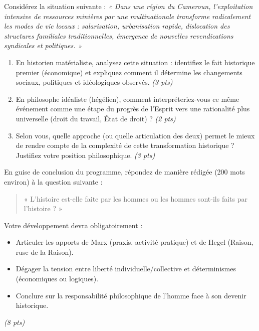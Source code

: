 \documentclass[11pt]{article}
\begin{document}
\begin{exercice}
Considérez la situation suivante : \textit{« Dans une région du Cameroun, l'exploitation intensive de ressources minières par une multinationale transforme radicalement les modes de vie locaux : salarisation, urbanisation rapide, dislocation des structures familiales traditionnelles, émergence de nouvelles revendications syndicales et politiques. »}

\begin{enumerate}
    \item En historien matérialiste, analysez cette situation : identifiez le fait historique premier (économique) et expliquez comment il détermine les changements sociaux, politiques et idéologiques observés. \textit{(3 pts)}
    \item En philosophe idéaliste (hégélien), comment interpréteriez-vous ce même événement comme une étape du progrès de l'Esprit vers une rationalité plus universelle (droit du travail, État de droit) ? \textit{(2 pts)}
    \item Selon vous, quelle approche (ou quelle articulation des deux) permet le mieux de rendre compte de la complexité de cette transformation historique ? Justifiez votre position philosophique. \textit{(3 pts)}
\end{enumerate}
\end{exercice}

\begin{exercice}
En guise de conclusion du programme, répondez de manière rédigée (200 mots environ) à la question suivante :

\begin{quote}
« L'histoire est-elle faite par les hommes ou les hommes sont-ils faits par l'histoire ? »
\end{quote}

Votre développement devra obligatoirement :
\begin{itemize}
    \item Articuler les apports de Marx (praxis, activité pratique) et de Hegel (Raison, ruse de la Raison).
    \item Dégager la tension entre liberté individuelle/collective et déterminismes (économiques ou logiques).
    \item Conclure sur la responsabilité philosophique de l'homme face à son devenir historique.
\end{itemize}
\textit{(8 pts)}
\end{exercice}
\end{document}
